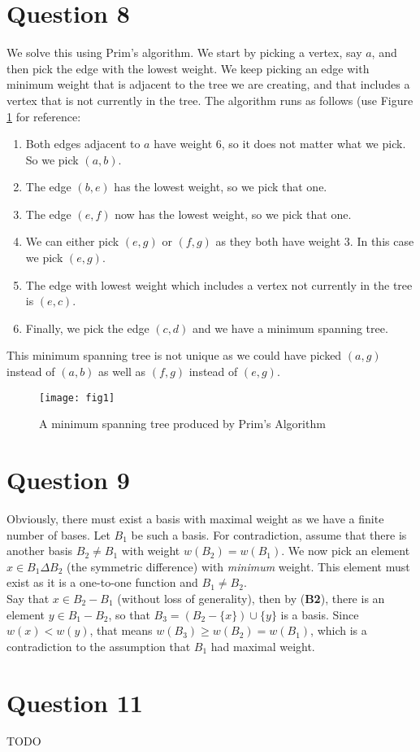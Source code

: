 \documentclass[a4paper, fleqn]{article}
\begin{document}
\section*{Question 8}
We solve this using Prim's algorithm. We start by picking a vertex, say $a$, and then pick the edge with the lowest weight. We keep picking an edge with minimum weight that is adjacent to the tree we are creating, and that includes a vertex that is not currently in the tree. The algorithm runs as follows (use Figure \ref{fig1} for reference:
\begin{enumerate}
  \item Both edges adjacent to $a$ have weight $6$, so it does not matter what we pick. So we pick $(a,b)$.
  \item The edge $(b,e)$ has the lowest weight, so we pick that one.
  \item The edge $(e,f)$ now has the lowest weight, so we pick that one.
  \item We can either pick $(e,g)$ or $(f,g)$ as they both have weight $3$. In this case we pick $(e,g)$.
  \item The edge with lowest weight which includes a vertex not currently in the tree is $(e,c)$.
  \item Finally, we pick the edge $(c,d)$ and we have a minimum spanning tree.
\end{enumerate}
This minimum spanning tree is not unique as we could have picked $(a,g)$ instead of $(a,b)$ as well as $(f,g)$ instead of $(e,g)$.
\begin{figure}[H]
  \centering
  \texttt{[image: fig1]}
  \caption{A minimum spanning tree produced by Prim's Algorithm}
  \label{fig1}
\end{figure}

\section*{Question 9}
Obviously, there must exist a basis with maximal weight as we have a finite number of bases. Let $B_1$ be such a basis. For contradiction, assume that there is another basis $B_2\neq B_1$ with weight $w(B_2)=w(B_1)$. We now pick an element $x\in B_1\Delta B_2$ (the symmetric difference) with \textit{minimum} weight. This element must exist as it is a one-to-one function and $B_1\neq B_2$.\\
Say that $x\in B_2-B_1$ (without loss of generality), then by (\textbf{B2}), there is an element $y\in B_1-B_2$, so that $B_3=(B_2-\{x\})\cup\{y\}$ is a basis. Since $w(x)<w(y)$, that means $w(B_3)\geq w(B_2)=w(B_1)$, which is a contradiction to the assumption that $B_1$ had maximal weight.

\section*{Question 11}
TODO
\end{document}

